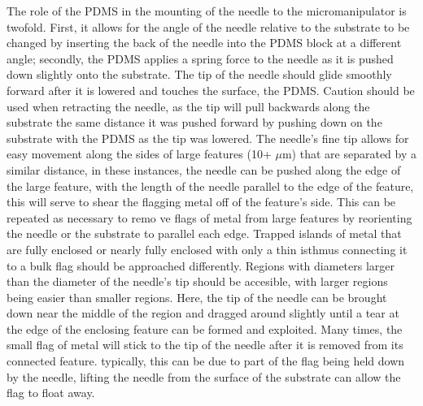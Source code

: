 \documentclass[prl,amsmath,twocolumn,amssymb,superscriptaddress,linenumbers]{revtex4-1}
\begin{document}
The role of the PDMS in the mounting of the needle to the micromanipulator is twofold. First, it allows for the angle of the needle relative to the substrate to be changed by inserting the back of the needle into the PDMS block at a different angle; secondly, the PDMS applies a spring force to the needle as it is pushed down slightly onto the substrate. The tip of the needle should glide smoothly forward after it is lowered and touches the surface, the PDMS. Caution should be used when retracting the needle, as the tip will pull backwards along the substrate the same distance it was pushed forward by pushing down on the substrate with the PDMS as the tip was lowered. The needle's fine tip allows for easy movement along the sides of large features (10+ $\mu$m) that are separated by a similar distance, in these instances, the needle can be pushed along the edge of the large feature, with the length of the needle parallel to the edge of the feature, this will serve to shear the flagging metal off of the feature's side. This can be repeated as necessary to remo ve flags of metal from large features by reorienting the needle or the substrate to parallel each edge. Trapped islands of metal that are fully enclosed or nearly fully enclosed with only a thin isthmus connecting it to a bulk flag should be approached differently. Regions with diameters larger than the diameter of the needle's tip should be accesible, with larger regions being easier than smaller regions.  Here, the tip of the needle can be brought down near the middle of the region and dragged around slightly until a tear at the edge of the enclosing feature can be formed and exploited. Many times, the small flag of metal will stick to the tip of the needle after it is removed from its connected feature. typically, this can be due to part of the flag being held down by the needle, lifting the needle from the surface of the substrate can allow the flag to float away. 



 
\end{document}
